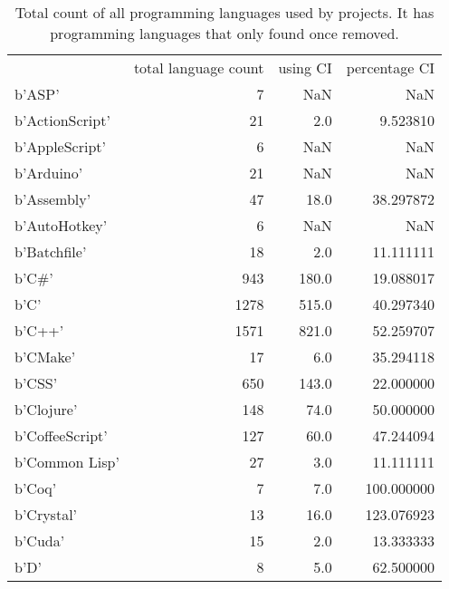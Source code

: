 \begin{table}
\centering
\caption{Total count of all programming languages used by projects. It has programming languages that only found once removed.}
\label{table:languages}
\begin{tabular}{|l|r|r|r|}
\hline
{} &  total language count &  using CI &  percentage CI \\

b'ASP'              &                     7 &       NaN &            NaN \\
b'ActionScript'     &                    21 &       2.0 &       9.523810 \\
b'AppleScript'      &                     6 &       NaN &            NaN \\
b'Arduino'          &                    21 &       NaN &            NaN \\
b'Assembly'         &                    47 &      18.0 &      38.297872 \\
b'AutoHotkey'       &                     6 &       NaN &            NaN \\
b'Batchfile'        &                    18 &       2.0 &      11.111111 \\
b'C\#'               &                   943 &     180.0 &      19.088017 \\
b'C'                &                  1278 &     515.0 &      40.297340 \\
b'C++'              &                  1571 &     821.0 &      52.259707 \\
b'CMake'            &                    17 &       6.0 &      35.294118 \\
b'CSS'              &                   650 &     143.0 &      22.000000 \\
b'Clojure'          &                   148 &      74.0 &      50.000000 \\
b'CoffeeScript'     &                   127 &      60.0 &      47.244094 \\
b'Common Lisp'      &                    27 &       3.0 &      11.111111 \\
b'Coq'              &                     7 &       7.0 &     100.000000 \\
b'Crystal'          &                    13 &      16.0 &     123.076923 \\
b'Cuda'             &                    15 &       2.0 &      13.333333 \\
b'D'                &                     8 &       5.0 &      62.500000 \\

\end{tabular}
\end{table}
